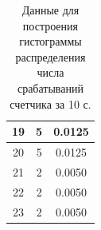 \documentclass[a4paper, 12pt]{article}
\begin{document}
\begin{enumerate}
\begin{table}[h!]
\begin{tabular}{| c | c | c |}
        19                       & 5                      & 0.0125                \\\hline
        20                       & 5                      & 0.0125                \\\hline
        21                       & 2                      & 0.0050                \\\hline
        22                       & 2                      & 0.0050                \\\hline
        23                       & 2                      & 0.0050                \\\hline
        \end{tabular}
        \caption{Данные для построения гистограммы распределения числа срабатываний счетчика за 10 с.}
        \label{tabl:data_hist_10}
    \end{table}


\end{enumerate}
\end{document}

